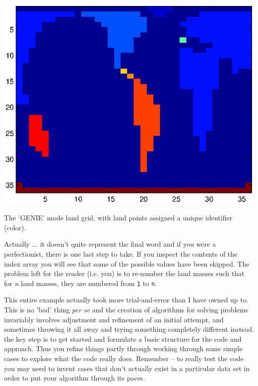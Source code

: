 \documentclass{tufte-book} %
\begin{document}
\begin{marginfigure}[0.0in]
\includegraphics[width=\linewidth]{ch3-genietopo6.eps}
\caption{The 'GENIE' mode land grid, with land points assigned a unique identifier (color).}
\label{fig:ch3-genietopo6}
\end{marginfigure}

Actually ... it doesn't quite represent the final word and if you were a perfectionist, there is one last step to take. If you inspect the contents of the index array you will see that some of the possible values have been skipped. The problem left for the reader (i.e. you) is to re-number the land masses such that for \textit{n} land masses, they are numbered from \texttt{1} to \texttt{n}. 

This entire example actually took more trial-and-error than I have owned up to. This is no 'bad' thing \textit{per se} and the creation of algorithms for solving problems invariably involves adjustment and refinement of an initial attempt, and sometimes throwing it all away and trying something completely different instead. the key step is to get started and formulate a basic structure for the code and approach. Thus you refine things partly through working through some simple cases to explore what the code really does. Remember -- to really test the code you may need to invent cases that don't actually exist in a particular data set in order to put your algorithm through its paces.
\end{document}
